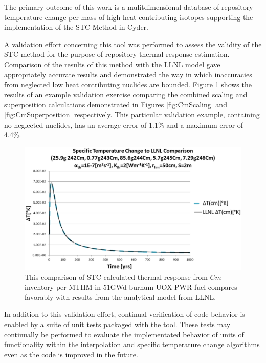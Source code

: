 
The primary outcome of this work is a mulitdimensional database of repository temperature 
change per mass of high heat contributing isotopes supporting the implementation 
of the \gls{STC} Method in Cyder. 

A validation effort concerning this tool was performed to assess the validity of 
the \gls{STC} method for the purpose of repository thermal response estimation.  
Comparison of the results of this method with the \gls{LLNL} model gave 
appropriately accurate results and demonstrated the way in which inaccuracies 
from neglected low heat contributing nuclides are bounded. Figure 
\ref{fig:CmValidation} shows the results of an example validation exercise 
comparing the combined scaling and  superposition calculations demonstrated in 
Figures \ref{fig:CmScaling} and \ref{fig:CmSuperposition} respectively. This 
particular validation example, containing no neglected nuclides, has 
an average error of 1.1\% and a maximum error of 4.4\%.

\begin{figure}[htp!]
\begin{center}
\includegraphics[width=\columnwidth]{images/CmValidation.eps}
\end{center}
\caption{This comparison of \gls{STC} calculated thermal response from $Cm$ 
inventory per MTHM in 51GWd burnum UOX PWR fuel compares favorably with results 
from the analytical model from LLNL.} 
\label{fig:CmValidation}
\end{figure}

In addition to this validation effort, continual verification of code behavior
is enabled by a suite of unit tests packaged with the tool. These tests may
continually be performed to evaluate the implementated behavior of units of
functionality within the interpolation and specific temperature change
algorithms even as the code is improved in the future.  
